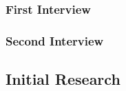 \begin{flushleft}
            \subsubsection{First Interview}
            \lipsum[2]
            \subsubsection{Second Interview}
            \lipsum[2]
        \bk

        \subsection{Initial Research} 
            \subsubsection{}
        
        \bk

\end{flushleft}